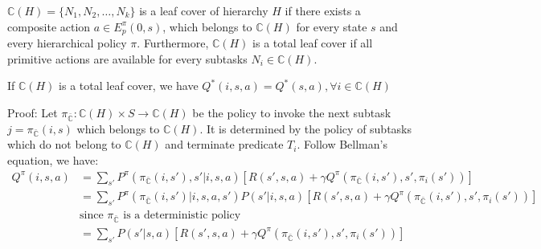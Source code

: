 \begin{definition}
    $\mathbb{C}(H) = \{N_1, N_2, \dots, N_k\}$ is a leaf cover of hierarchy $H$ if 
    there exists a composite action $a \in E_p^{\pi}(0, s)$, which belongs to $\mathbb{C}(H)$ for every
    state $s$ and every hierarchical policy $\pi$.
    Furthermore, $\mathbb{C}(H)$ is a total leaf cover if all primitive actions are available for every 
    subtasks $N_i \in \mathbb{C}(H)$.
\end{definition}



\begin{theorem}
    If $\mathbb{C}(H)$ is a total leaf cover, we have $Q^*(i, s, a) = Q^*(s, a), \forall i \in \mathbb{C}(H)$
\end{theorem}
Proof: Let $\pi_{\bar{\mathbb{C}}}: \mathbb{C}(H) \times S \rightarrow \mathbb{C}(H)$ be the policy to invoke
the next subtask $j = \pi_{\bar{\mathbb{C}}}(i, s)$ which belongs to $\mathbb{C}(H)$. It is determined
by the policy of subtasks which do not belong to $\mathbb{C}(H)$ and terminate predicate $T_i$. Follow Bellman's equation, we have:
\begin{align}
    Q^{\pi}(i, s, a) &= \sum_{s'} P^{\pi}(\pi_{\bar{\mathbb{C}}}(i, s'), s'|i, s, a) [R(s', s, a) + \gamma Q^{\pi}(\pi_{\bar{\mathbb{C}}}(i, s'), s', \pi_i(s'))]\\
    &=\sum_{s'}P^{\pi}(\pi_{\bar{\mathbb{C}}}(i, s')| i, s, a, s') P(s' | i, s, a)  [R(s', s, a) + \gamma Q^{\pi}(\pi_{\bar{\mathbb{C}}}(i, s'), s', \pi_i(s'))]\\
    &\mbox{since $\pi_{\bar{\mathbb{C}}}$ is a deterministic policy}\\
    &=\sum_{s'} P(s' | s, a) [R(s', s, a) + \gamma Q^{\pi}(\pi_{\bar{\mathbb{C}}}(i, s'), s', \pi_i(s'))]
    \label{eq:MaxIrr}
\end{align}

